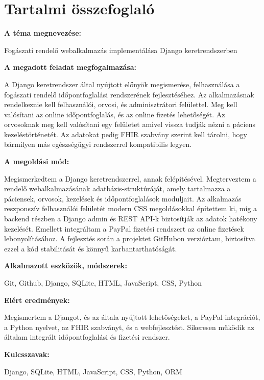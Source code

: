 \chapter*{Tartalmi összefoglaló}

\noindent\textbf{A téma megnevezése:}

\noindent Fogászati rendelő webalkalmazás implementálása Django keretrendszerben

\noindent\textbf{A megadott feladat megfogalmazása:}

\noindent A Django keretrendszer által nyújtott előnyök megismerése, felhasználása a fogászati rendelő időpontfoglalási rendszerének fejlesztéséhez. Az alkalmazásnak rendelkeznie kell felhasználói, orvosi, és adminisztrátori felülettel. Meg kell valósítani az online időpontfoglalás, és az online fizetés lehetőségét. Az orvosoknak meg kell valósítani egy felületet amivel vissza tudják nézni a páciens kezeléstörténetét. Az adatokat pedig FHIR szabvány szerint kell tárolni, hogy bármilyen más egészségügyi rendszerrel kompatibilis legyen.

\noindent\textbf{A megoldási mód:}

\noindent Megismerkedtem a Django keretrendszerrel, annak felépítésével. Megterveztem a rendelő webalkalmazásának adatbázis-struktúráját, amely tartalmazza a páciensek, orvosok, kezelések és időpontfoglalások moduljait. Az alkalmazás reszponszív felhasználói felületét modern CSS megoldásokkal építettem ki, míg a backend részben a Django admin és REST API-k biztosítják az adatok hatékony kezelését. Emellett integráltam a PayPal fizetési rendszert az online fizetések lebonyolításához. A fejlesztés során a projektet GitHubon verzióztam, biztosítva ezzel a kód stabilitását és könnyű karbantarthatóságát.

\noindent\textbf{Alkalmazott eszközök, módszerek:}

\noindent Git, Github, Django, SQLite, HTML, JavaScript, CSS, Python

\noindent\textbf{Elért eredmények:}

\noindent Megismertem a Djangot, és az általa nyújtott lehetőségeket, a PayPal integrációt, a Python nyelvet, az FHIR szabványt, és a webfejlesztést. Sikeresen működik az általam integrált időpontfoglalási és fizetési rendszer.

\noindent\textbf{Kulcsszavak:}

\noindent Django, SQLite, HTML, JavaScript, CSS, Python, ORM
